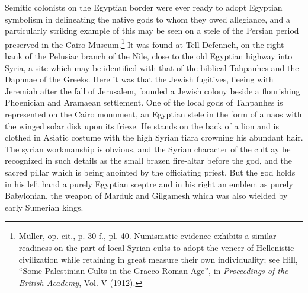 \documentclass[12pt,oneside]{book}
\begin{document}
Semitic colonists on the Egyptian border were ever ready to adopt Egyptian symbolism in delineating the native gods to whom they owed allegiance, and a particularly striking example of this may be seen on a stele of the Persian period preserved in the Cairo Museum.\footnote{M\"uller, op. cit., p. 30 f., pl. 40. Numismatic evidence exhibits a similar readiness on the part of local Syrian cults to adopt the veneer of Hellenistic civilization while retaining in great measure their own individuality; see Hill, ``Some Palestinian Cults in the Graeco-Roman Age'', in \textit{Proceedings of the British Academy}, Vol. V (1912).} It was found at Tell Defenneh, on the right bank of the Pelusiac branch of the Nile, close to the old Egyptian highway into Syria, a site which may be identified with that of the biblical Tahpanhes and the Daphnae of the Greeks. Here it was that the Jewish fugitives, fleeing with Jeremiah after the fall of Jerusalem, founded a Jewish colony beside a flourishing Phoenician and Aramaean settlement. One of the local gods of Tahpanhes is represented on the Cairo monument, an Egyptian stele in the form of a naos with the winged solar disk upon its frieze. He stands on the back of a lion and is clothed in Asiatic costume with the high Syrian tiara crowning his abundant hair. The syrian workmanship is obvious, and the Syrian character of the cult ay be recognized in such details as the small brazen fire-altar before the god, and the sacred pillar which is being anointed by the officiating priest. But the god holds in his left hand a purely Egyptian sceptre and in his right an emblem as purely Babylonian, the weapon of Marduk and Gilgamesh which was also wielded by early Sumerian kings. \par 
\end{document}
